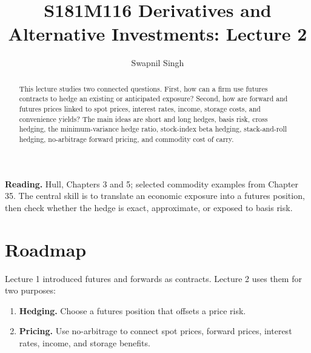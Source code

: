 

\title{S181M116 Derivatives and Alternative Investments: Lecture 2}
\author{Swapnil Singh}
\date{}


\setlength{\headheight}{26pt}
\graphicspath{{images/lecture-2/}}

\newcommand{\St}{S_T}
\newcommand{\Szero}{S_0}
\newcommand{\Ft}{F_t}
\newcommand{\Fzero}{F_0}
\newcommand{\K}{K}
\newcommand{\PV}{\mathrm{PV}}
\newcommand{\pnl}{\mathrm{P\&L}}
\newcommand{\Var}{\operatorname{Var}}
\newcommand{\Cov}{\operatorname{Cov}}
\newcommand{\Corr}{\operatorname{Corr}}


\maketitle

\begin{abstract}
This lecture studies two connected questions. First, how can a firm use futures
contracts to hedge an existing or anticipated exposure? Second, how are forward
and futures prices linked to spot prices, interest rates, income, storage costs,
and convenience yields? The main ideas are short and long hedges, basis risk,
cross hedging, the minimum-variance hedge ratio, stock-index beta hedging,
stack-and-roll hedging, no-arbitrage forward pricing, and commodity cost of
carry.
\end{abstract}

\begin{boxD}
\textbf{Reading.} Hull, Chapters 3 and 5; selected commodity examples from
Chapter 35. The central skill is to translate an economic exposure into a
futures position, then check whether the hedge is exact, approximate, or exposed
to basis risk.
\end{boxD}

\section{Roadmap}

Lecture 1 introduced futures and forwards as contracts. Lecture 2 uses them for
two purposes:
\begin{enumerate}
    \item \textbf{Hedging.} Choose a futures position that offsets a price risk.
    \item \textbf{Pricing.} Use no-arbitrage to connect spot prices, forward
    prices, interest rates, income, and storage benefits.
\end{enumerate}

